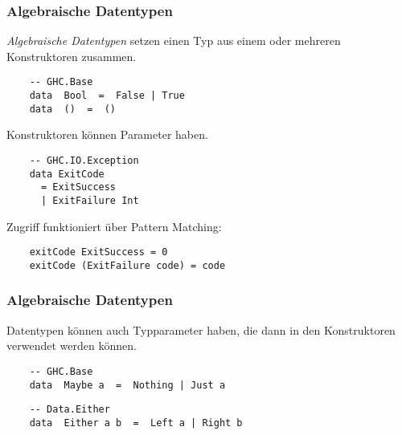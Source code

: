 \documentclass{beamer}
\begin{document}
\begin{frame}[fragile]
  \frametitle{Algebraische Datentypen}
  \emph{Algebraische Datentypen} setzen einen Typ aus einem oder mehreren Konstruktoren zusammen.
  \begin{lstlisting}
    -- GHC.Base
    data  Bool  =  False | True
    data  ()  =  ()
  \end{lstlisting}
  Konstruktoren können Parameter haben.
  \begin{lstlisting}
    -- GHC.IO.Exception
    data ExitCode
      = ExitSuccess
      | ExitFailure Int
  \end{lstlisting}
  Zugriff funktioniert über Pattern Matching:
  \begin{lstlisting}
    exitCode ExitSuccess = 0
    exitCode (ExitFailure code) = code
  \end{lstlisting}
\end{frame}

\begin{frame}[fragile]
  \frametitle{Algebraische Datentypen}
  Datentypen können auch Typparameter haben, die dann in den Konstruktoren verwendet werden können.
  \begin{lstlisting}
    -- GHC.Base
    data  Maybe a  =  Nothing | Just a
  \end{lstlisting}
  \begin{lstlisting}
    -- Data.Either
    data  Either a b  =  Left a | Right b
  \end{lstlisting}
\end{frame}
\end{document}
